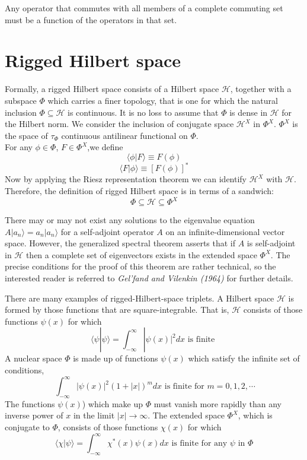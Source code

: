 \begin{newthem}
Any operator that commutes with all members of a complete commuting set must be a function of the operators in that set.
\end{newthem}

\section{Rigged Hilbert space}
\begin{newdef}
Formally, a rigged Hilbert space consists of a Hilbert space $\mathcal{H}$, together with a subspace $\Phi$ which carries a finer topology, that is one for which the natural inclusion $\Phi \subseteq \mathcal{H}$ is continuous. 
It is no loss to assume that $\Phi$ is dense in $\mathcal{H}$ for the Hilbert norm. We consider the inclusion of conjugate space $\mathcal{H}^X$ in $\Phi^X$. $\Phi^X$ is the space of $\tau_{\Phi}$ continuous antilinear functional on $\Phi$.\\
For any $\phi \in \Phi$, $F \in \Phi^X$,we define
\[\langle \phi | F \rangle \equiv F(\phi)\]
\[\langle F | \phi \rangle \equiv [F(\phi)]^*\]
Now by applying the Riesz representation theorem we can identify $\mathcal{H}^X$ with $\mathcal{H}$. Therefore, the definition of rigged Hilbert space is in terms of a sandwich:
\[\Phi \subseteq \mathcal{H} \subseteq \Phi^X\]
\end{newdef}
There may or may not exist any solutions to the eigenvalue equation $A|a_n\rangle = a_n |a_n\rangle$ for a self-adjoint operator $A$ on an infinite-dimensional vector space. However, the generalized spectral theorem asserts that if $A$ is self-adjoint in $\mathcal{H}$ then a complete set of eigenvectors exists in the extended space $\Phi^X$. The precise conditions for the proof of this theorem are rather technical, so the interested reader is referred to \emph{Gel'fand and Vilenkin (1964)} for further details.

There are many examples of rigged-Hilbert-space triplets. A Hilbert space $\mathcal{H}$ is formed by those functions that are square-integrable. That is, $\mathcal{H}$ consists of those functions $\psi(x)$ for which
\[\langle \psi | \psi \rangle = \int_{-\infty}^{\infty} |\psi(x)|^2 dx \mbox{ is finite }\]
A nuclear space $\Phi$ is made up of functions $\psi(x)$ which satisfy the infinite set of conditions,
\[\ \int_{-\infty}^{\infty} |\psi(x)|^2(1+|x|)^m dx \mbox{ is finite for } m = 0,1,2,\cdots\]
The functions $\psi(x)$) which make up $\Phi$ must vanish more rapidly than any inverse power of $x$ in the limit $|x| \to \infty$. The extended space $\Phi^X$, which is conjugate to $\Phi$, consists of those functions $\chi(x)$ for which
\[\langle \chi | \psi \rangle = \int_{-\infty}^{\infty} \chi^*(x)\psi(x) dx \mbox{ is finite for any } \psi \mbox{ in } \Phi\]

